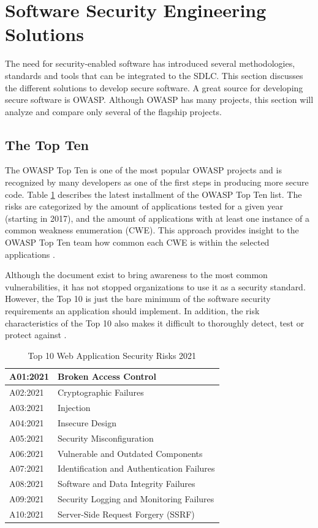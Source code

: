 \section{Software Security Engineering Solutions}
The need for security-enabled software has introduced several methodologies, standards and tools that can be integrated to the SDLC. This section discusses the different solutions to develop secure software. A great source for developing secure software is OWASP. Although OWASP has many projects, this section will analyze and compare only several of the flagship projects. 

\subsection{The Top Ten}
The OWASP Top Ten is one of the most popular OWASP projects and is recognized by many developers as one of the first steps in producing more secure code. Table \ref{tab:top-10} describes the latest installment of the OWASP Top Ten list. The risks are categorized by the amount of applications tested for a given year (starting in 2017), and the amount of applications with at least one instance of a common weakness enumeration (CWE). This approach provides insight to the OWASP Top Ten team how common each CWE is within the selected applications \cite{owasp_top10_introduction}. 

Although the document exist to bring awareness to the most common vulnerabilities, it has not stopped organizations to use it as a security standard. However, the Top 10 is just the bare minimum of the software security requirements an application should implement. In addition, the risk characteristics of the Top 10 also makes it difficult to thoroughly detect, test or protect against \cite{owasp_top10_as_standard}.

\begin{table}[!h]
    \caption{Top 10 Web Application Security Risks 2021}
    \label{tab:top-10}
    \begin{tabular}{|l|p{30em}|}
        \hline  
        A01:2021 & Broken Access Control \\ 
        \hline
        A02:2021 & Cryptographic Failures \\
        \hline
        A03:2021 & Injection \\
        \hline
        A04:2021 & Insecure Design \\
        \hline
        A05:2021 & Security Misconfiguration \\
        \hline
        A06:2021 & Vulnerable and Outdated Components \\
        \hline
        A07:2021 & Identification and Authentication Failures \\
        \hline
        A08:2021 & Software and Data Integrity Failures \\
        \hline
        A09:2021 & Security Logging and Monitoring Failures \\
        \hline
        A10:2021 & Server-Side Request Forgery (SSRF) \\
        \hline
    \end{tabular}
\end{table}

